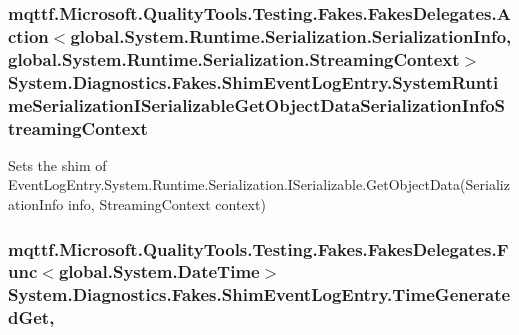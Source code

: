 \hypertarget{class_system_1_1_diagnostics_1_1_fakes_1_1_shim_event_log_entry_a1732ddf20091d125c460b4343d59ce74}{
\subsubsection[{System\-Runtime\-Serialization\-I\-Serializable\-Get\-Object\-Data\-Serialization\-Info\-Streaming\-Context}]{\setlength{\rightskip}{0pt plus 5cm}mqttf.\-Microsoft.\-Quality\-Tools.\-Testing.\-Fakes.\-Fakes\-Delegates.\-Action$<$global.\-System.\-Runtime.\-Serialization.\-Serialization\-Info, global.\-System.\-Runtime.\-Serialization.\-Streaming\-Context$>$ System.\-Diagnostics.\-Fakes.\-Shim\-Event\-Log\-Entry.\-System\-Runtime\-Serialization\-I\-Serializable\-Get\-Object\-Data\-Serialization\-Info\-Streaming\-Context\hspace{0.3cm}{\ttfamily [set]}}}\label{class_system_1_1_diagnostics_1_1_fakes_1_1_shim_event_log_entry_a1732ddf20091d125c460b4343d59ce74}


Sets the shim of Event\-Log\-Entry.\-System.\-Runtime.\-Serialization.\-I\-Serializable.\-Get\-Object\-Data(\-Serialization\-Info info, Streaming\-Context context)

\hypertarget{class_system_1_1_diagnostics_1_1_fakes_1_1_shim_event_log_entry_acc70f3bf6c18ae635d2963a784ef7a48}{
\subsubsection[{Time\-Generated\-Get}]{\setlength{\rightskip}{0pt plus 5cm}mqttf.\-Microsoft.\-Quality\-Tools.\-Testing.\-Fakes.\-Fakes\-Delegates.\-Func$<$global.\-System.\-Date\-Time$>$ System.\-Diagnostics.\-Fakes.\-Shim\-Event\-Log\-Entry.\-Time\-Generated\-Get\hspace{0.3cm}{\ttfamily [get]}, {\ttfamily [set]}}}\label{class_system_1_1_diagnostics_1_1_fakes_1_1_shim_event_log_entry_acc70f3bf6c18ae635d2963a784ef7a48}


